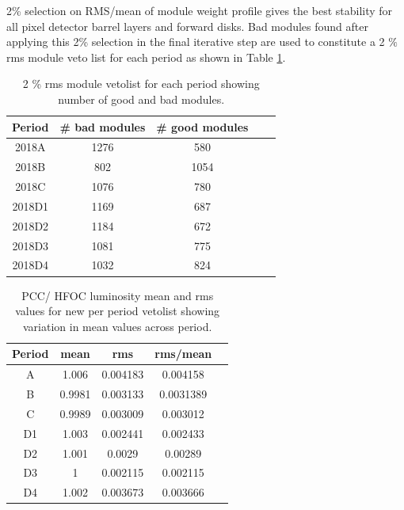 2\% selection on RMS/mean of module weight profile gives the best stability for all pixel detector barrel layers and forward disks. Bad modules found after applying this 2\% selection in the final iterative step are used to constitute a 2 $\%$ rms module veto list for each period as shown in Table \ref{tab:per period veto}. 
                                                                                 

 \begin{table}
  \begin{center}
    \begin{tabular}{ccccc}  
    \textbf{Period}   & \textbf{\# bad modules} & \textbf{\# good modules} \\ \hline
     2018A      &   1276   &  580    \\  
     2018B      &    802  &     1054  \\ 
     2018C      &   1076  &    780   \\ 
     2018D1     &  1169  &     687  \\ 
     2018D2     &  1184  &    672   \\ 
     2018D3     &  1081  &    775   \\ 
     2018D4     &  1032  &     824  \\ 
      \end{tabular}
    \caption[Module veto list for each period]{2 \% rms module vetolist for each period showing number of good and bad modules.}
    \label{tab:per period veto}
  \end{center}
\end{table}


\begin{table}[!ht]
\centering
\begin{tabular}{ccccc}
    \textbf{Period} & \textbf{mean} & \textbf{rms} &  \textbf{rms/mean} \\ \hline
    A & 1.006 & 0.004183 & 0.004158 \\
    B & 0.9981  & 0.003133 & 0.0031389 \\
    C & 0.9989  & 0.003009 & 0.003012\\
    D1 & 1.003  & 0.002441 & 0.002433 \\
    D2 & 1.001  & 0.0029 & 0.00289 \\
   D3  & 1  & 0.002115 & 0.002115 \\
   D4  & 1.002  & 0.003673 & 0.003666 \\ 
\end{tabular}
\caption{%
 PCC/ HFOC luminosity mean and rms values for new per period vetolist showing variation in mean values across period.
}
\label{tab:pccvis_diffveto}
\end{table}



